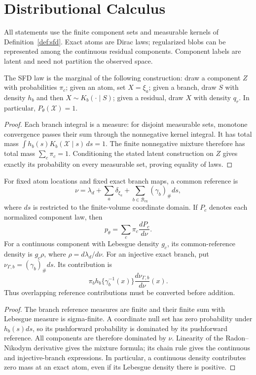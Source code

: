\section{Distributional Calculus}
\label{app:calculus}
All statements use the finite component sets and measurable kernels of
Definition~\ref{def:sfd}. Exact atoms are Dirac laws; regularized blobs can
be represented among the continuous residual components. Component labels
are latent and need not partition the observed space.

\begin{proposition}
\label{prop:normalization}
The SFD law is the marginal of the following construction: draw a component
$Z$ with probabilities $\pi_c$; given an atom, set $X=\xi_a$; given a branch,
draw $S$ with density $h_b$ and then $X\sim K_b(\cdot\mid S)$; given a
residual, draw $X$ with density $q_r$. In particular, $P_\theta(\mathcal X)=1$.
\end{proposition}
\begin{proof}
Each branch integral is a measure: for disjoint measurable sets,
monotone convergence passes their sum through the nonnegative kernel
integral. It has total mass $\int h_b(s)K_b(\mathcal X\mid s)\,ds=1$.
The finite nonnegative mixture therefore has total mass $\sum_c\pi_c=1$.
Conditioning the stated latent construction on $Z$ gives exactly its
probability on every measurable set, proving equality of laws.
\end{proof}

\begin{proposition}
\label{prop:mixed-density}
For fixed atom locations and fixed exact branch maps, a common reference is
\[
 \nu=\lambda_d+\sum_a\delta_{\xi_a}
            +\sum_{b\in\mathcal B_{\mathrm{ex}}}(\gamma_b)_\#ds,
\]
where $ds$ is restricted to the finite-volume coordinate domain. If $P_c$
denotes each normalized component law, then
\[
 p_\theta=\sum_c\pi_c\frac{dP_c}{d\nu}.
\]
For a continuous component with Lebesgue density $g_c$, its common-reference
density is $g_c\rho$, where $\rho=d\lambda_d/d\nu$. For an injective exact
branch, put $\nu_{\Gamma,b}=(\gamma_b)_\#ds$. Its contribution is
\[
 \pi_b h_b\{\gamma_b^{-1}(x)\}
                    \frac{d\nu_{\Gamma,b}}{d\nu}(x).
\]
Thus overlapping reference contributions must be converted before addition.
\end{proposition}
\begin{proof}
The branch reference measures are finite and their finite sum with Lebesgue
measure is sigma-finite. A coordinate null set has zero probability under
$h_b(s)ds$, so its pushforward probability is dominated by its pushforward
reference. All components are therefore dominated by $\nu$. Linearity of
the Radon--Nikodym derivative gives the mixture formula; its chain rule gives
the continuous and injective-branch expressions. In particular, a continuous
density contributes zero mass at an exact atom, even if its Lebesgue density
there is positive.
\end{proof}


